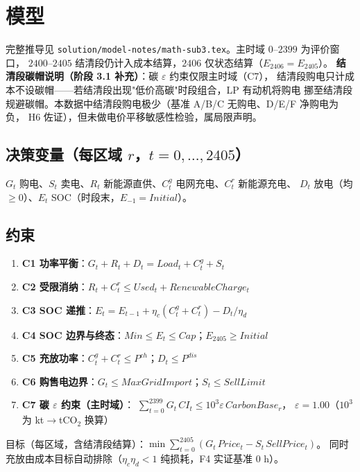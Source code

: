 \documentclass{internal-report}
\begin{document}
\section{模型}

完整推导见 \texttt{solution/model-notes/math-sub3.tex}。主时域 $0$--$2399$ 为评价窗口，
$2400$--$2405$ 结清段仍计入成本结算，$2406$ 仅状态结算（$E_{2406}=E_{2405}$）。
\textbf{结清段碳帽说明（阶段 3.1 补充）}：碳 $\varepsilon$ 约束仅限主时域（C7），
结清段购电只计成本不设碳帽——若结清段出现"低价高碳"时段组合，LP 有动机将购电
挪至结清段规避碳帽。本数据中结清段购电极少（基准 A/B/C 无购电、D/E/F 净购电为负，
H6 佐证），但未做电价平移敏感性检验，属局限声明。

\subsection{决策变量（每区域 $r$，$t=0,\ldots,2405$）}

$G_t$ 购电、$S_t$ 卖电、$R_t$ 新能源直供、$C^g_t$ 电网充电、$C^r_t$ 新能源充电、
$D_t$ 放电（均 $\ge0$）、$E_t$ SOC（时段末，$E_{-1}=Initial$）。

\subsection{约束}

\begin{enumerate}
  \item \textbf{C1 功率平衡}：$G_t + R_t + D_t = Load_t + C^g_t + S_t$
  \item \textbf{C2 受限消纳}：$R_t + C^r_t \le Used_t + RenewableCharge_t$
  \item \textbf{C3 SOC 递推}：$E_t = E_{t-1} + \eta_c(C^g_t+C^r_t) - D_t/\eta_d$
  \item \textbf{C4 SOC 边界与终态}：$Min \le E_t \le Cap$；$E_{2405} \ge Initial$
  \item \textbf{C5 充放功率}：$C^g_t+C^r_t \le P^{ch}$；$D_t \le P^{dis}$
  \item \textbf{C6 购售电边界}：$G_t \le MaxGridImport$；$S_t \le SellLimit$
  \item \textbf{C7 碳 $\varepsilon$ 约束（主时域）}：
        $\sum_{t=0}^{2399} G_t\,CI_t \le 10^3\varepsilon\, CarbonBase_r$，
        $\varepsilon=1.00$（$10^3$ 为 kt$\to$tCO$_2$ 换算）
\end{enumerate}

目标（每区域，含结清段结算）：$\min \sum_{t=0}^{2405}\left(G_t\,Price_t - S_t\,SellPrice_t\right)$。
同时充放由成本目标自动排除（$\eta_c\eta_d<1$ 纯损耗，F4 实证基准 0 h）。
\end{document}
